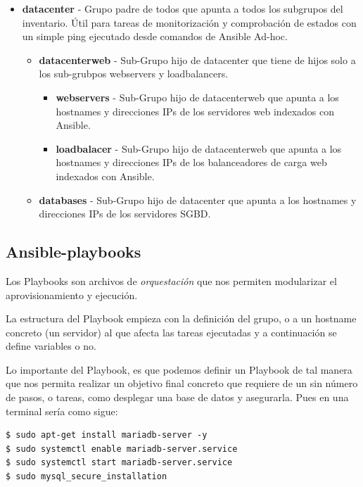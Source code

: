 \begin{itemize}
    \item \textbf{datacenter} - Grupo padre de todos que apunta a todos los subgrupos del inventario. Útil para tareas de monitorización y comprobación de estados con un simple ping ejecutado desde comandos de Ansible Ad-hoc.
    \begin{itemize}
        \item \textbf{datacenterweb} - Sub-Grupo hijo de datacenter que tiene de hijos solo a los sub-grubpos webservers y loadbalancers.
        \begin{itemize}
            \item \textbf{webservers} - Sub-Grupo hijo de datacenterweb que apunta a los hostnames y direcciones IPs de los servidores web indexados con Ansible.
            \item \textbf{loadbalacer} - Sub-Grupo hijo de datacenterweb que apunta a los hostnames y direcciones IPs de los balanceadores de carga web indexados con Ansible.
        \end{itemize}
        \item \textbf{databases} - Sub-Grupo hijo de datacenter que apunta a los hostnames y direcciones IPs de los servidores SGBD.
    \end{itemize}
\end{itemize}

\subsection{Ansible-playbooks}

Los Playbooks son archivos de \emph{orquestación} que nos permiten modularizar el aprovisionamiento y ejecución.

La estructura del Playbook empieza con la definición del grupo, o a un hostname concreto (un servidor) al que afecta las tareas ejecutadas y a continuación se define variables o no.

Lo importante del Playbook, es que podemos definir un Playbook de tal manera que nos permita realizar un objetivo final concreto que requiere de un sin número de pasos, o tareas, como desplegar una base de datos y asegurarla. Pues en una terminal sería como sigue:

\begin{lstlisting}[style=mybash]
$ sudo apt-get install mariadb-server -y
$ sudo systemctl enable mariadb-server.service
$ sudo systemctl start mariadb-server.service
$ sudo mysql_secure_installation
\end{lstlisting}

